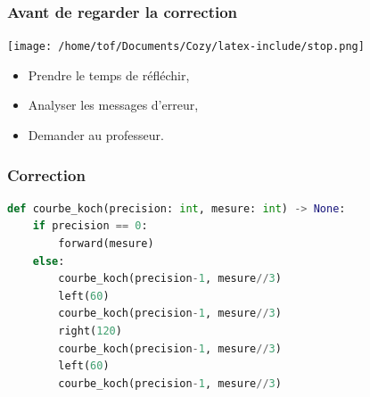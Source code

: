 \documentclass[svgnames,11pt]{beamer}
\begin{document}
\begin{frame}
    \frametitle{Avant de regarder la correction}
\begin{center}
    \centering
    \texttt{[image: /home/tof/Documents/Cozy/latex-include/stop.png]}
    \end{center}
{\Large
    \begin{itemize}
        \item Prendre le temps de réfléchir,
        \item Analyser les messages d'erreur,
        \item Demander au professeur.
    \end{itemize}
}
\end{frame}
\begin{frame}[fragile]
    \frametitle{Correction}

\begin{center}
\begin{lstlisting}[language=Python , basicstyle=\ttfamily\small, xleftmargin=1em, xrightmargin=1em]
def courbe_koch(precision: int, mesure: int) -> None:
    if precision == 0:
        forward(mesure)
    else:
        courbe_koch(precision-1, mesure//3)
        left(60)
        courbe_koch(precision-1, mesure//3)
        right(120)
        courbe_koch(precision-1, mesure//3)
        left(60)
        courbe_koch(precision-1, mesure//3)
\end{lstlisting}
\label{CODE}
\end{center}

\end{frame}
\end{document}

